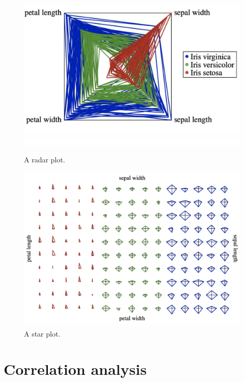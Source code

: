 \begin{figure}[ht]
    \centering
    \begin{minipage}[b]{0.43\textwidth}
        \includegraphics[width=\textwidth]{img/radar plot.png}
        \caption{A radar plot.}
    \end{minipage}
    \hfill
    \begin{minipage}[b]{0.43\textwidth}
        \includegraphics[width=\textwidth]{img/star plot.png}
        \caption{A star plot.}
    \end{minipage}
\end{figure}

\newpage

\section{Correlation analysis}

